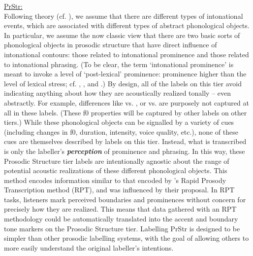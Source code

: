 \uline{PrStr:}\\ Following \DIFdelbegin {}\DIFdelend \DIFaddbegin {}\DIFaddend theory (cf. \citealt{pierrehumbert80}), we assume that there are different types of intonational events, which are associated with different types of abstract phonological objects. In particular, we assume the now classic view that there are two basic sorts of phonological objects in prosodic structure that have direct influence of intonational contours: those related to intonational prominence and those related to intonational phrasing. (To be clear, the term ‘intonational prominence’ is meant to invoke a level of ‘post-lexical’ prominence: prominence higher than the level of lexical stress; cf. \citealt{bolinger58}, \citealt{libermanprince77}, and \citealt{beckmanedwards94}.) By design, all of the labels on this tier avoid indicating anything about how they are acoustically realized tonally – even abstractly. For example, differences like  vs. , or  vs.  are purposely not captured at all in these labels. (These f0 properties will be captured by other labels on other tiers.) While these phonological objects can be signalled by a variety of cues (including changes in f0, duration, intensity, voice quality, etc.), none of these cues are themselves described by labels on this tier. Instead, what is transcribed is only the labeller’s \textit{\textbf{perception}} of prominence and phrasing. In this way, these Prosodic Structure tier labels are intentionally agnostic about the range of potential acoustic realizations of these different phonological objects. This method encodes information similar to that encoded by \citeauthor{cole-14}’s \citeyear{cole-14} Rapid Prosody Transcription method (RPT), and was influenced by their proposal. In RPT tasks, listeners mark perceived boundaries and prominences without concern for precisely how they are realized. This means that data gathered with an RPT methodology could be automatically translated into the accent and boundary tone markers on the Prosodic Structure tier. Labelling PrStr is designed to be simpler than other prosodic labelling systems, with the goal of allowing others to more easily understand the original labeller’s intentions.

